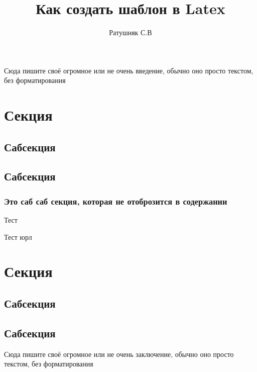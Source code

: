 
\def\institute{Автоматики и информационных технологий}
\def\kafedra{Электроники, телекоммуникации и космических технологий}
\def\tipraboty{СРСП}
\author{Ратушняк С.В}
\title{Как создать шаблон в Latex}
\def\prepod{Гончаров А.Б}
\def\shifrop{0A00000}

	
	
	\tableofcontents
	\newpage
	
	Сюда пишите своё огромное или не очень введение, обычно оно просто текстом, без форматирования
	\newpage
	
	\section{Секция}
	\subsection{Сабсекция}
	\subsection{Сабсекция}
	\subsubsection{Это саб саб секция, которая не отоброзится в содержании}
	Тест\cite{PinillaToro2019}
	
	Тест юрл
	\newpage
	
	\section{Секция}
	\subsection{Сабсекция}
	\subsection{Сабсекция}
	\newpage
	
	Сюда пишите своё огромное или не очень заключение, обычно оно просто текстом, без форматирования
	
	\newpage
	\printbibliography
